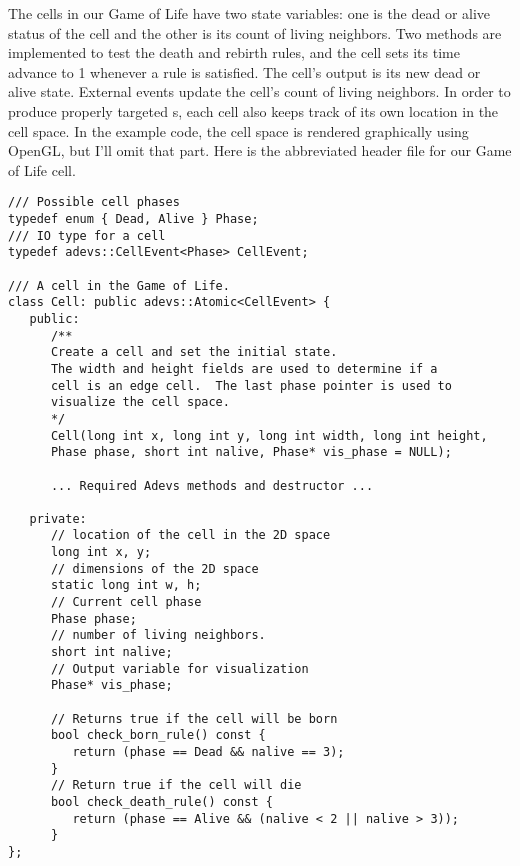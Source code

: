 The  cells in our Game of Life have two state variables: one is the dead or alive status of the cell and the other is its count of living neighbors. Two methods are implemented to test the death and rebirth rules, and the cell sets its time advance to 1 whenever a rule is satisfied. The cell's output is its new dead or alive state. External events update the cell's count of living neighbors. In order to produce properly targeted s, each cell also keeps track of its own location in the cell space. In the example code, the cell space is rendered graphically using OpenGL, but I'll omit that part. Here is the abbreviated header file for our Game of Life cell.
\begin{verbatim}
/// Possible cell phases
typedef enum { Dead, Alive } Phase;
/// IO type for a cell
typedef adevs::CellEvent<Phase> CellEvent;

/// A cell in the Game of Life.  
class Cell: public adevs::Atomic<CellEvent> {
   public:
      /**
      Create a cell and set the initial state.
      The width and height fields are used to determine if a
      cell is an edge cell.  The last phase pointer is used to
      visualize the cell space.
      */
      Cell(long int x, long int y, long int width, long int height, 
      Phase phase, short int nalive, Phase* vis_phase = NULL);

      ... Required Adevs methods and destructor ...

   private:   
      // location of the cell in the 2D space
      long int x, y;
      // dimensions of the 2D space
      static long int w, h;
      // Current cell phase
      Phase phase;
      // number of living neighbors.
      short int nalive;
      // Output variable for visualization
      Phase* vis_phase;

      // Returns true if the cell will be born
      bool check_born_rule() const {
         return (phase == Dead && nalive == 3);
      }
      // Return true if the cell will die
      bool check_death_rule() const {
         return (phase == Alive && (nalive < 2 || nalive > 3));
      }
};
\end{verbatim}

